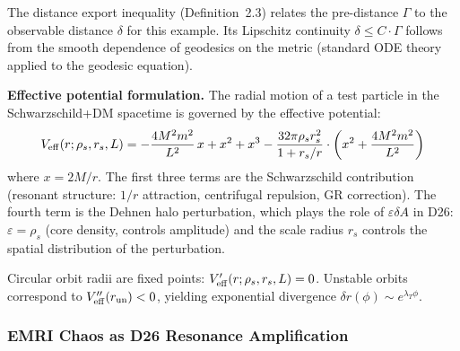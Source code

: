 \documentclass[
]{article}
\begin{document}
The distance export inequality (Definition~2.3) relates the pre-distance $\Gamma$ to the observable distance $\delta$ for this example. Its Lipschitz continuity $\delta \leq C \cdot \Gamma$ follows from the smooth dependence of geodesics on the metric (standard ODE theory applied to the geodesic equation).

\textbf{Effective potential formulation.} The radial motion of a test particle in the Schwarzschild+DM spacetime is governed by the effective potential:
\begin{equation}\label{eq:veff}
V_{\rm eff}(r; \rho_s, r_s, L) = -\frac{4M^2m^2}{L^2}\,x + x^2 + x^3 - \frac{32\pi\rho_s r_s^2}{1 + r_s/r} \cdot \left(x^2 + \frac{4M^2m^2}{L^2}\right)
\end{equation}
where $x = 2M/r$. The first three terms are the Schwarzschild contribution (resonant structure: $1/r$ attraction, centrifugal repulsion, GR correction). The fourth term is the Dehnen halo perturbation, which plays the role of $\varepsilon\delta A$ in D26: $\varepsilon = \rho_s$ (core density, controls amplitude) and the scale radius $r_s$ controls the spatial distribution of the perturbation.

Circular orbit radii are fixed points: $V_{\rm eff}'(r; \rho_s, r_s, L) = 0$. Unstable orbits correspond to $V_{\rm eff}''(r_{\rm un}) < 0$, yielding exponential divergence $\delta r(\phi) \sim e^{\lambda_T \phi}$.

\subsubsection{EMRI Chaos as D26 Resonance Amplification}\label{subsec:emri-resonance}
\end{document}
